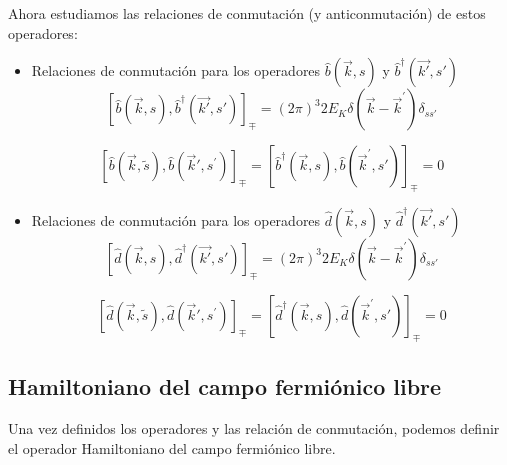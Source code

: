 Ahora estudiamos las relaciones de conmutación (y anticonmutación) de estos operadores:
\begin{itemize}
  \item Relaciones de conmutación para los operadores $\hat{b}(\vec{k}, s)$ y $ \hat{b}^{\dagger}(\vec{k'}, s')$
  $$
\left[\hat{b}(\vec{k}, s), \hat{b}^{\dagger}(\vec{k'}, s')\right]_\mp=(2 \pi)^3 2 E_K \delta\left(\vec{k}-\vec{k}^{\prime}\right) \delta_{s s'}
$$

$$
\left[\hat{b}(\vec{k}, \tilde{s}), \hat{b}\left(\vec{k}', s^{\prime}\right)\right]_\mp=\left[\hat{b}^{\dagger}(\vec{k}, s), \hat{b}\left(\vec{k}^{\prime}, s'\right)\right]_\mp=0
$$
  \item Relaciones de conmutación para los operadores $\hat{d}(\vec{k}, s)$ y $ \hat{d}^{\dagger}(\vec{k'}, s')$
  $$
\left[\hat{d}(\vec{k}, s), \hat{d}^{\dagger}(\vec{k'}, s')\right]_\mp=(2 \pi)^3 2 E_K \delta\left(\vec{k}-\vec{k}^{\prime}\right) \delta_{s s'}
$$

$$
\left[\hat{d}(\vec{k}, \tilde{s}), \hat{d}\left(\vec{k}', s^{\prime}\right)\right]_\mp=\left[\hat{d}^{\dagger}(\vec{k}, s), \hat{d}\left(\vec{k}^{\prime}, s'\right)\right]_\mp=0
$$
\end{itemize}

\subsection{Hamiltoniano del campo fermiónico libre}
Una vez definidos los operadores y las relación de conmutación, podemos definir el operador Hamiltoniano del campo fermiónico libre.

